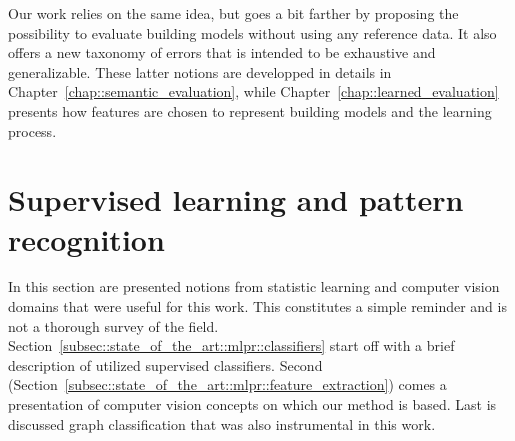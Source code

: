         Our work relies on the same idea, but goes a bit farther by proposing the possibility to evaluate building models without using any reference data.
        It also offers a new taxonomy of errors that is intended to be exhaustive and generalizable.
        These latter notions are developped in details in Chapter~\ref{chap::semantic_evaluation}, while Chapter~\ref{chap::learned_evaluation} presents how features are chosen to represent building models and the learning process.

\section{Supervised learning and pattern recognition}
    \label{sec::state_of_the_art::mlpr}
    In this section are presented notions from statistic learning and computer vision domains that were useful for this work.
    This constitutes a simple reminder and is not a thorough survey of the field.
    Section~\ref{subsec::state_of_the_art::mlpr::classifiers} start off with a brief description of utilized supervised classifiers.
    Second (Section~\ref{subsec::state_of_the_art::mlpr::feature_extraction}) comes a presentation of computer vision concepts on which our method is based.
    Last is discussed graph classification that was also instrumental in this work.

